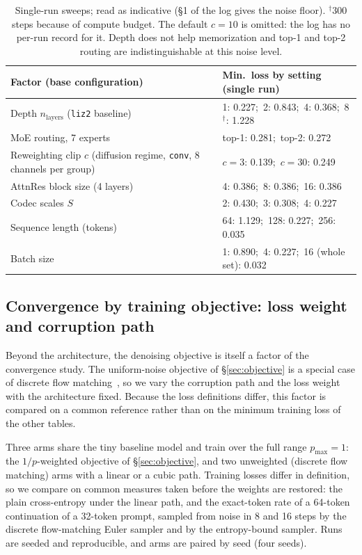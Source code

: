 \documentclass[11pt]{article}
\begin{document}
\begin{table}[t]
\centering
\small
\begin{tabular}{p{4.6cm}p{9.6cm}}
\toprule
Factor (base configuration) & Min.\ loss by setting (single run) \\
\midrule
Depth $n_{\text{layers}}$ (\texttt{liz2} baseline) & 1: 0.227;\ 2: 0.843;\ 4: 0.368;\ 8$^{\dagger}$: 1.228 \\
MoE routing, 7 experts & top-1: 0.281;\ top-2: 0.272 \\
Reweighting clip $c$ (diffusion regime, \texttt{conv}, 8 channels per group) & $c=3$: 0.139;\ $c=30$: 0.249 \\
AttnRes block size (4 layers) & 4: 0.386;\ 8: 0.386;\ 16: 0.386 \\
Codec scales $S$ & 2: 0.430;\ 3: 0.308;\ 4: 0.227 \\
Sequence length (tokens) & 64: 1.129;\ 128: 0.227;\ 256: 0.035 \\
Batch size & 1: 0.890;\ 4: 0.227;\ 16 (whole set): 0.032 \\
\bottomrule
\end{tabular}
\caption{Single-run sweeps; read as indicative (\S1 of the log gives the
noise floor). $^{\dagger}$300 steps because of compute budget. The default
$c=10$ is omitted: the log has no per-run record for it. Depth does not help
memorization and top-1 and top-2 routing are indistinguishable at this noise
level.}
\label{tab:sweeps}
\end{table}

\subsection{Convergence by training objective: loss weight and corruption path}\label{sec:flowarms}

Beyond the architecture, the denoising objective is itself a factor of the convergence study. The uniform-noise
objective of \S\ref{sec:objective} is a special case of discrete flow matching~\citep{gat2024dfm}, so we vary the
corruption path and the loss weight with the architecture fixed. Because the loss definitions differ, this factor is
compared on a common reference rather than on the minimum training loss of the other tables.

Three arms share the tiny baseline model and train over the full range $p_{\max}=1$: the $1/p$-weighted objective of
\S\ref{sec:objective}, and two unweighted (discrete flow matching) arms with a linear or a cubic path. Training losses
differ in definition, so we compare on common measures taken before the weights are restored: the plain cross-entropy under
the linear path, and the exact-token rate of a 64-token continuation of a 32-token prompt, sampled from noise in 8 and 16
steps by the discrete flow-matching Euler sampler and by the entropy-bound sampler. Runs are seeded and reproducible, and
arms are paired by seed (four seeds).
\end{document}
